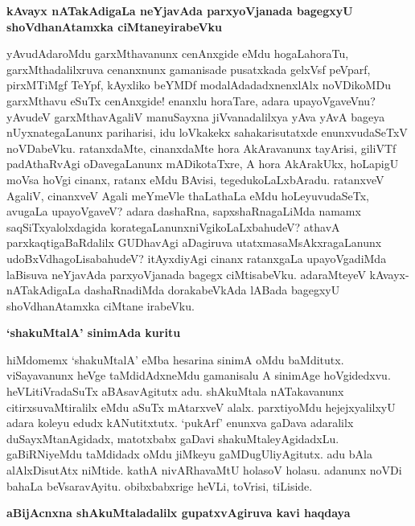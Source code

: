 {\bigskip
\noindent
{\large\bf kAvayx nATakAdigaLa neYjavAda parxyoVjanada bagegxyU shoVdhanAtamxka ciMtaneyirabeVku}}\label{page250}
\medskip

\noindent
yAvudAdaroMdu garxMthavanunx cenAnxgide eMdu hogaLahoraTu, garxMthadalilxruva cenanxnunx gama\-nisade pusatxkada gelxVsf peVparf, pirxMTiMgf TeYpf, kAyxliko beYMDf modalAdadadxnenxlAlx noVDi\-koMDu garxMthavu eSuTx cenAnxgide! enanxlu horaTare, adara upayoVgaveVnu? yAvudeV garxMtha\-vAgaliV manuSayxna jiVvanadalilxya yAva yAvA bageya nUyxnategaLanunx pariharisi, idu loVkakekx saha\-karisu\-tatxde enunxvudaSeTxV noVDabeVku. ratanxdaMte, cinanxdaMte hora AkAravanunx tayArisi, giliVTf padAthaR\-vAgi oDavegaLanunx mADikotaTxre, A hora AkArakUkx, hoLa\-pigU moVsa hoVgi cinanx, ratanx eMdu BAvisi, tegedukoLaLxbAradu. ratanxveV AgaliV, cinanxveV Agali meYmeVle thaLathaLa eMdu hoLeyuvu\-daSeTx, avugaLa upa\-yoVgaveV? adara dashaRna, sapxshaRnagaLiMda namamx saqSiTxyalolxdagida korate\-gaLanunx\break niVgikoLaLxbahudeV? athavA parxkaqtigaBaRdalilx GUDhavAgi aDagiruva utatxma\break saMsAkxra\-gaLanunx udoBxVdha\-goLisabahudeV? itAyxdiyAgi cinanx ratanxgaLa upa\break\-yoVga\-diMda laBisuva neYjavAda parxyoVjanada bagegx ciMtisabeVku. adaraMteyeV kAvayx-nATakAdigaLa dashaRnadiMda dorakabeVkAda lABada bagegxyU shoVdha\-nAtamxka ciMtane irabeVku.

{\bigskip
\noindent
{\large\bf `shakuMtalA' sinimAda kuritu}}\label{page234}
\medskip

\noindent
hiMdomemx `shakuMtalA' eMba hesarina sinimA oMdu baMditutx. viSayavanunx heVge taMdidAdxneMdu gamanisalu A sinimAge hoVgidedxvu. heVLitiVradaSuTx aBAsavAgitutx adu. shAkuMtala nATakavanunx citirxsuvaMtiralilx eMdu aSuTx mAtarxveV alalx. parxtiyoMdu hejejxyalilxyU adara koleyu edudx kANutitxtutx. `pukArf' enunxva gaDava adaralilx duSayxMtanAgidadx, matotxbabx gaDavi shakuMtaleyAgi\-dadxLu. gaBiRNiyeMdu taMdidadx oMdu jiMkeyu gaMDugUliyAgitutx. adu bAla alAlxDisutAtx niMtide. kathA nivARhavaMtU holasoV holasu. adanunx noVDi bahaLa beVsaravAyitu. obibxbabxrige heVLi, toVrisi, tiLiside.

{\bigskip
\noindent
{\large\bf aBijAcnxna shAkuMtaladalilx gupatxvAgiruva kavi haqdaya}}\label{page234}
\medskip

